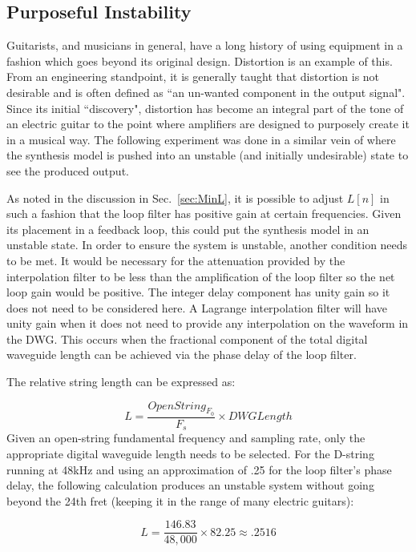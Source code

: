 \documentclass[../main.tex]{subfiles}
\begin{document}
\subsection{Purposeful Instability}
Guitarists, and musicians in general, have a long history of using equipment in a fashion which goes beyond its original design. Distortion is an example of this. From an engineering standpoint, it is generally taught that distortion is not desirable and is often defined as ``an un-wanted component in the output signal". Since its initial ``discovery", distortion has become an integral part of the tone of an electric guitar to the point where amplifiers are designed to purposely create it in a musical way. The following experiment was done in a similar vein of where the synthesis model is pushed into an unstable (and initially undesirable) state to see the produced output.

As noted in the discussion in Sec.~\ref{sec:MinL}, it is possible to adjust $L[n]$ in such a fashion that the loop filter has positive gain at certain frequencies. Given its placement in a feedback loop, this could put the synthesis model in an unstable state. In order to ensure the system is unstable, another condition needs to be met. It would be necessary for the attenuation provided by the interpolation filter to be less than the amplification of the loop filter so the net loop gain would be positive. The integer delay component has unity gain so it does not need to be considered here. A Lagrange interpolation filter will have unity gain when it does not need to provide any interpolation on the waveform in the DWG. This occurs when the fractional component of the total digital waveguide length can be achieved via the phase delay of the loop filter.

The relative string length can be expressed as:

\begin{equation}
    L = \frac{OpenString_{F_0}}{F_s} \times DWGLength    
\end{equation}
Given an open-string fundamental frequency and sampling rate, only the appropriate digital waveguide length needs to be selected. For the D-string running at 48kHz and using an approximation of .25 for the loop filter's phase delay, the following calculation produces an unstable system without going beyond the 24th fret (keeping it in the range of many electric guitars):

\begin{equation}
\label{eq:LUnstable}
    L = \frac{146.83}{48,000} \times 82.25 \approx .2516
\end{equation}
\end{document}
